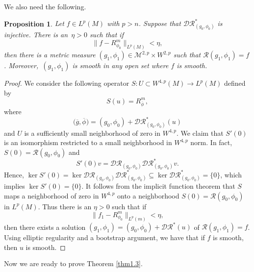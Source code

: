 \documentclass[10pt,a4paper]{amsart}
\numberwithin{equation}{section}
\newtheorem{Proposition}[Theorem]{Proposition}
 { \theoremstyle{definition}
\newtheorem{Definition}[Theorem]{Definition}
\newtheorem{Note}[Theorem]{Note}
\newtheorem{Example}[Theorem]{Example}
\newtheorem{Remark}[Theorem]{Remark} }
\begin{document}
We also need the following.

\begin{Proposition}\label{prop6.2}
 Let $f\in L^p(M)$ with $p>n$. Suppose that $\mathcal{DR}_{(g_0,\phi_0)}^*$ is injective.
 There is an~$\eta>0$ such that if
\begin{equation*}
 \|f-R_{\phi_0}^m\|_{L^p(M)}<\eta,
\end{equation*}
then there is a metric measure $(g_1,\phi_1)\in \mathcal{M}^{2,p}\times W^{2,p}$ such that $\mathcal{R}(g_1,\phi_1)=f$. Moreover,~$(g_1,\phi_1)$ is smooth in any open set where $f$ is smooth.
\end{Proposition}
\begin{proof}
 We consider the following operator $S\colon U\subset W^{4,p}(M)\to L^p(M)$ defined by
\begin{equation*}
 S(u)=R_{\overline{\phi}}^m,
\end{equation*}
where
\begin{equation*}
 \bigl(\overline{g},\overline{\phi}\bigr)=(g_0,\phi_0)+\mathcal{DR}_{(g_0,\phi_0)}^*(u)
\end{equation*}
and $U$ is a sufficiently small neighborhood of zero in $W^{4,p}$. We claim that $S'(0)$ is an isomorphism restricted to a small neighborhood in $W^{4,p}$ norm. In fact, $S(0)=\mathcal{R}(g_0,\phi_0)$ and
\begin{equation*}
 S'(0)v=\mathcal{DR}_{(g_0,\phi_0)}\mathcal{DR}^*_{(g_0,\phi_0)}v.
\end{equation*}
Hence, $\ker S'(0)=\ker \mathcal{DR}_{(g_0,\phi_0)}\mathcal{DR}^*_{(g_0,\phi_0)}\subseteq\ker \mathcal{DR}^*_{(g_0,\phi_0)}=\{0\}$,
which implies $\ker S'(0)=\{0\}$. It follows from the implicit function theorem that $S$ maps a neighborhood of zero in $W^{4,p}$ onto a neighborhood $S(0)=\mathcal{R}(g_0,\phi_0)$ in $L^p(M)$. Thus there is an $\eta>0$ such that if
\begin{equation*}
 \|f_1-R_{\phi_0}^m\|_{L^p(m)}<\eta,
\end{equation*}
then there exists a solution $(g_1,\phi_1)=(g_0,\phi_0)+\mathcal{DR}^*(u)$ of $\mathcal{R}(g_1,\phi_1)=f$. Using elliptic regularity and a bootstrap argument, we have that if $f$ is smooth, then $u$ is smooth.
\end{proof}


Now we are ready to prove Theorem \ref{thm1.3}.
\end{document}
